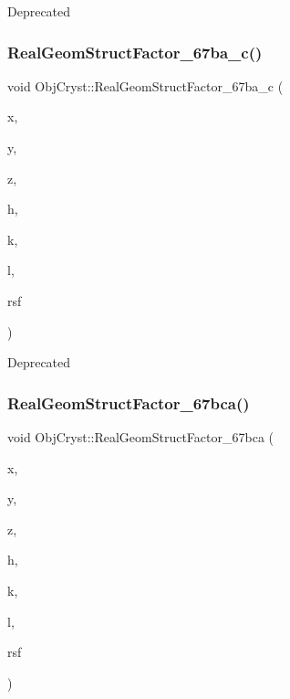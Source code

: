 \begin{DoxyRefDesc}{Deprecated}
\item[\mbox{\hyperlink{deprecated__deprecated000011}{Deprecated}}]\end{DoxyRefDesc}
\mbox{\label{namespace_obj_cryst_a5cc947568ed264bc5c846e590e41d071}} 
\subsubsection{\texorpdfstring{RealGeomStructFactor\_67ba\_c()}{RealGeomStructFactor\_67ba\_c()}}
{\footnotesize\ttfamily void Obj\+Cryst\+::\+Real\+Geom\+Struct\+Factor\+\_\+67ba\+\_\+c (\begin{DoxyParamCaption}\item[{const R\+E\+AL}]{x,  }\item[{const R\+E\+AL}]{y,  }\item[{const R\+E\+AL}]{z,  }\item[{const Cryst\+Vector\+\_\+\+R\+E\+AL \&}]{h,  }\item[{const Cryst\+Vector\+\_\+\+R\+E\+AL \&}]{k,  }\item[{const Cryst\+Vector\+\_\+\+R\+E\+AL \&}]{l,  }\item[{Cryst\+Vector\+\_\+\+R\+E\+AL \&}]{rsf }\end{DoxyParamCaption})}

\begin{DoxyRefDesc}{Deprecated}
\item[\mbox{\hyperlink{deprecated__deprecated000007}{Deprecated}}]\end{DoxyRefDesc}
\mbox{\label{namespace_obj_cryst_a5838f57e66d4218cf94c2654970e4b44}} 
\subsubsection{\texorpdfstring{RealGeomStructFactor\_67bca()}{RealGeomStructFactor\_67bca()}}
{\footnotesize\ttfamily void Obj\+Cryst\+::\+Real\+Geom\+Struct\+Factor\+\_\+67bca (\begin{DoxyParamCaption}\item[{const R\+E\+AL}]{x,  }\item[{const R\+E\+AL}]{y,  }\item[{const R\+E\+AL}]{z,  }\item[{const Cryst\+Vector\+\_\+\+R\+E\+AL \&}]{h,  }\item[{const Cryst\+Vector\+\_\+\+R\+E\+AL \&}]{k,  }\item[{const Cryst\+Vector\+\_\+\+R\+E\+AL \&}]{l,  }\item[{Cryst\+Vector\+\_\+\+R\+E\+AL \&}]{rsf }\end{DoxyParamCaption})}


